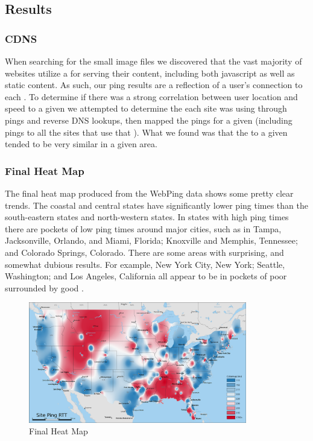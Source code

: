 \subsection{Results}

\subsubsection{CDNS}
When searching for the small image files we discovered that the vast majority of websites utilize a \cdn for serving their content, including both javascript as well as static content. As such, our ping results are a reflection of a user's connection to each \cdn. To determine if there was a strong correlation between user location and speed to a given \cdn we attempted to determine the \cdn each site was using through \icmp pings and reverse DNS lookups, then mapped the pings for a given \cdn (including pings to all the sites that use that \cdn). What we found was that the \rtt to a given \cdn tended to be very similar in a given area.

\subsubsection{Final Heat Map}
The final heat map produced from the WebPing data shows some pretty clear trends. The coastal and central states have significantly lower ping times than the south-eastern states and north-western states. In states with high ping times there are pockets of low ping times around major cities, such as in  Tampa, Jacksonville, Orlando, and Miami, Florida; Knoxville and Memphis, Tennessee; and Colorado Springs, Colorado. There are some areas with surprising, and somewhat dubious results. For example, New York City, New York; Seattle, Washington; and Los Angeles, California all appear to be in pockets of poor \rtt surrounded by good \rtt.

\begin{figure}[H]
    \centering
    \includegraphics[width=0.85\textwidth]{images/siteping/site_ping_rtt_idw.png}
    \caption{Final Heat Map}
    \label{fig:siteping)_heatmap}
\end{figure}

